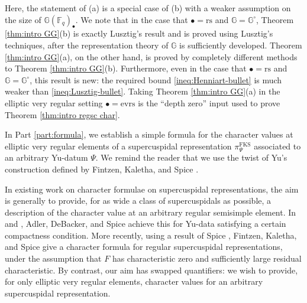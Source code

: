 \documentclass{amsart}
\newcommand{\evrs}{\mathrm{evrs}}
\newcommand{\rs}{\mathrm{rs}}
\newcommand{\FKS}{\mathrm{FKS}}
\newcommand{\FF}{\mathbb{F}}
\newcommand{\bbG}{\mathbb{G}}
\theoremstyle{plain}
\theoremstyle{definition}
\theoremstyle{remark}
\theoremstyle{theorem}
\begin{document}
Here, the statement of (a) is a special case of (b) with a weaker assumption on the size of $\bbG(\FF_q)_\bullet$. We note that in the case that $\bullet = \rs$ and $\bbG = \bbG^\circ$, Theorem \ref{thm:intro GG}(b) is exactly Lusztig's result and is proved using Lusztig's techniques, after the representation theory of $\bbG$ is sufficiently developed. Theorem \ref{thm:intro GG}(a), on the other hand, is proved by completely different methods to Theorem \ref{thm:intro GG}(b). Furthermore, even in the case that $\bullet = \rs$ and $\bbG = \bbG^\circ$, this result is new: the required bound \eqref{ineq:Henniart-bullet} is much weaker than \eqref{ineq:Lusztig-bullet}. Taking Theorem \ref{thm:intro GG}(a) in the elliptic very regular setting $\bullet = \evrs$ is the ``depth zero'' input used to prove Theorem \ref{thm:intro regsc char}.

In Part \ref{part:formula}, we establish a simple formula for the character values at elliptic very regular elements of a supercuspidal representation $\pi_{\Psi}^{\FKS}$ associated to an arbitrary Yu-datum $\Psi$. We remind the reader that we use the twist of Yu's construction defined by Fintzen, Kaletha, and Spice \cite{FKS21}. 

In existing work on character formulae on supercuspidal representations, the aim is generally to provide, for as wide a class of supercuspidals as possible, a description of the character value at an arbitrary regular semisimple element.
In \cite{AS09} and \cite{DS18}, Adler, DeBacker, and Spice achieve this for Yu-data satisfying a certain compactness condition.
More recently, using a result of Spice \cite{Spi18, Spi21}, Fintzen, Kaletha, and Spice \cite{FKS21} give a character formula for regular supercuspidal representations, under the assumption that $F$ has characteristic zero and sufficiently large residual characteristic.
By contrast, our aim has swapped quantifiers: we wish to provide, for only elliptic very regular elements, character values for an arbitrary supercuspidal representation.
\end{document}
